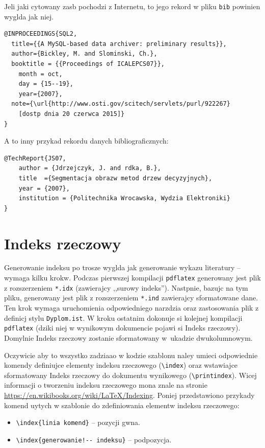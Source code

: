 Jeli jaki cytowany zasb pochodzi z Internetu, to jego rekord w pliku \texttt{bib} powinien wyglda jak niej.
\begin{lstlisting}[basicstyle=\footnotesize\ttfamily]
@INPROCEEDINGS{SQL2, 
  title={{A MySQL-based data archiver: preliminary results}}, 
  author={Bickley, M. and Slominski, Ch.},
  booktitle = {{Proceedings of ICALEPCS07}},
	month = oct,
	day = {15--19},
	year={2007}, 
  note={\url{http://www.osti.gov/scitech/servlets/purl/922267} 
	[dostp dnia 20 czerwca 2015]}
}
\end{lstlisting}
A to inny przykad rekordu danych bibliograficznych:
\begin{lstlisting}[basicstyle=\footnotesize\ttfamily]
@TechReport{JS07,
	author = {Jdrzejczyk, J. and rdka, B.},
	title  ={Segmentacja obrazw metod drzew decyzyjnych},
	year = {2007},
	institution = {Politechnika Wrocawska, Wydzia Elektroniki}
}
\end{lstlisting}

\section{Indeks rzeczowy}
\label{sec:indeks}
Generowanie indeksu  po trosze wyglda jak generowanie wykazu literatury -- wymaga kilku krokw. Podczas pierwszej kompilacji \texttt{pdflatex} generowany jest plik z rozszerzeniem \texttt{*.idx} (zawierajcy ,,surowy indeks''). Nastpnie, bazujc na tym pliku, generowany jest plik z rozszerzeniem \texttt{*.ind} zawierajcy sformatowane dane. Ten krok wymaga uruchomienia odpowiedniego narzdzia oraz zastosowania plik z definicj stylu \texttt{Dyplom.ist}. W kroku ostatnim dokonuje si kolejnej kompilacji \texttt{pdflatex} (dziki niej w wynikowym dokumencie pojawi si Indeks rzeczowy). Domylnie Indeks rzeczowy zostanie sformatowany w~ukadzie dwukolumnowym.

Oczywicie aby to wszystko zadziaao w kodzie szablonu naley umieci odpowiednie komendy definiujce elementy indeksu rzeczowego (\verb?\index?) oraz wstawiajce sformatowany Indeks rzeczowy do dokumentu wynikowego (\verb?\printindex?). Wicej informacji o tworzeniu indeksu rzeczowego mona znale na stronie \url{https://en.wikibooks.org/wiki/LaTeX/Indexing}. Poniej przedstawiono przykady komend uytych w szablonie do zdefiniowania elementw indeksu rzeczowego:
\begin{itemize}
\item \verb?\index{linia komend}? -- pozycji gwna.
\item \verb?\index{generowanie!-- indeksu}? -- podpozycja.
\end{itemize}

